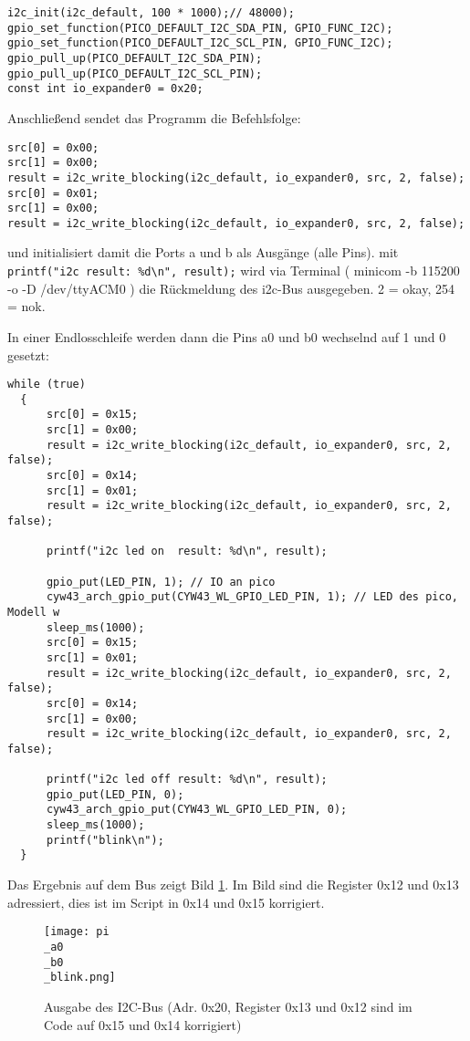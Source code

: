 \documentclass[a4paper,10pt]{scrartcl}
\begin{document}
\begin{lstlisting}[float,caption=init I2C-Bus,captionpos=b,label=listing:PicoInit]
i2c_init(i2c_default, 100 * 1000);// 48000);
gpio_set_function(PICO_DEFAULT_I2C_SDA_PIN, GPIO_FUNC_I2C);
gpio_set_function(PICO_DEFAULT_I2C_SCL_PIN, GPIO_FUNC_I2C);
gpio_pull_up(PICO_DEFAULT_I2C_SDA_PIN);
gpio_pull_up(PICO_DEFAULT_I2C_SCL_PIN);
const int io_expander0 = 0x20;
\end{lstlisting}


Anschließend sendet das Programm die Befehlsfolge:
\begin{lstlisting}[float,caption=Init der Ports a und b auf Ausgang,captionpos=b]
src[0] = 0x00;
src[1] = 0x00;
result = i2c_write_blocking(i2c_default, io_expander0, src, 2, false);
src[0] = 0x01;
src[1] = 0x00;
result = i2c_write_blocking(i2c_default, io_expander0, src, 2, false);
\end{lstlisting}

und initialisiert damit die Ports a und b als Ausgänge (alle Pins).
mit \lstinline|printf("i2c result: %d\n", result);| wird via Terminal ( minicom -b 115200 -o -D /dev/ttyACM0 ) die Rückmeldung des i2c-Bus ausgegeben. 2 = okay, 254 = nok.

In einer Endlosschleife werden dann die Pins a0 und b0 wechselnd auf 1 und 0 gesetzt:
\begin{lstlisting}[float,caption=Endlosschleife. Schaltet a0 und b0 zyklisch ein und aus,captionpos=b]while (true)
  {
      src[0] = 0x15;
      src[1] = 0x00;
      result = i2c_write_blocking(i2c_default, io_expander0, src, 2, false);
      src[0] = 0x14;
      src[1] = 0x01;
      result = i2c_write_blocking(i2c_default, io_expander0, src, 2, false);

      printf("i2c led on  result: %d\n", result);

      gpio_put(LED_PIN, 1); // IO an pico
      cyw43_arch_gpio_put(CYW43_WL_GPIO_LED_PIN, 1); // LED des pico, Modell w
      sleep_ms(1000);
      src[0] = 0x15;
      src[1] = 0x01;
      result = i2c_write_blocking(i2c_default, io_expander0, src, 2, false);
      src[0] = 0x14;
      src[1] = 0x00;
      result = i2c_write_blocking(i2c_default, io_expander0, src, 2, false);

      printf("i2c led off result: %d\n", result);
      gpio_put(LED_PIN, 0);
      cyw43_arch_gpio_put(CYW43_WL_GPIO_LED_PIN, 0);
      sleep_ms(1000);
      printf("blink\n");
  }
\end{lstlisting}
Das Ergebnis auf dem Bus zeigt Bild \ref{abb:PiPicoBlink01}. Im Bild sind die Register 0x12 und 0x13 adressiert, dies ist im Script in 0x14 und 0x15 korrigiert.
\begin{figure}[htb]
 \texttt{[image: pi\\\_a0\\\_b0\\\_blink.png]}
 \caption{Ausgabe des I2C-Bus (Adr. 0x20, Register 0x13 und 0x12 sind im Code auf 0x15 und 0x14 korrigiert)}
 \label{abb:PiPicoBlink01}
\end{figure}
\end{document}
